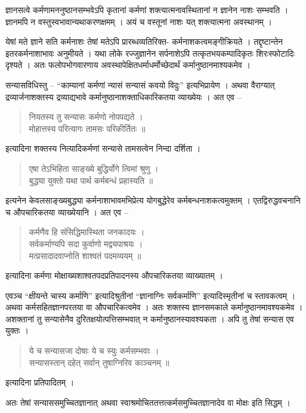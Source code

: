 ज्ञानसत्वे कर्मणामननुष्ठानसम्भवेऽपि कृतानां कर्मणां शक्त्यात्मनावस्थितानां न ज्ञानेन नाशः सम्भवति । ज्ञानमपि न वस्तुस्वभावान्यथाकरणक्षमम् । अयं च वस्तूनां नाशः यत् शक्त्यात्मना अवस्थानम् ।

येषां मते ज्ञाने सति कर्मनाशः तेषां मतेऽपि प्रारब्धव्यतिरिक्त- कर्मनाशकत्वमङ्गीक्रियते । तद्दृष्टान्तेन इतरकर्मनाशाभावः अनुमीयते । यथा लोके रज्जुज्ञानेन सर्पनाशेऽपि तत्कृतभयकम्पादिकृतः शिरःस्फोटादिः दृश्यते । अतः फलोपभोगवारणाय अवस्थापेक्षितधर्माधर्मोच्छेदार्थं कर्मानुष्ठानमाश्यकमेव ।

सन्यासविधिस्तु – “काम्यानां कर्मणां न्यासं सन्यासं कवयो विदुः” इत्यभिप्रायेण । अथवा वैराग्यात् द्रव्यार्जनाशक्तस्य द्रव्याद्यभावे कर्मानुष्ठानाशक्ताधिकारिकतया व्याख्येयः । 	अत एव –
\begin{verse}
नियतस्य तु सन्यासः कर्मणो नोपपद्यते ।\\
मोहात्तस्य परित्यागः तामसः परिकीर्तितः ॥
\end{verse}
इत्यादिना शक्तस्य नित्यादिकर्मणां सन्यासे तामसत्वेन निन्दा दर्शिता ।		
\begin{verse}
एषा तेऽभिहिता साङ्ख्ये बुद्धिर्योगे त्विमां श्रुणु ।\\
बुद्ध्या युक्तो यथा पार्थ कर्मबन्धं प्रहास्यति ॥
\end{verse}
इत्यनेन केवलसाङ्ख्यबुद्ध्या कर्मनाशाभावमभिप्रेत्य योगबुद्धेरेव कर्मबन्धनाशकत्वमुक्तम् । एतद्विरुद्धवचनानि च औपचारिकतया व्याख्येयानि । अत एव –
\begin{verse}
कर्मणैव हि संसिद्धिमास्थिता जनकादयः ।\\
सर्वकर्माण्यपि सदा कुर्वाणो मद्व्यपाश्रयः ।\\
मत्प्रसादादवाप्नोति शाश्वतं पदमव्ययम् ॥
\end{verse}
इत्यादिना कर्मणा मोक्षाख्यशाश्वतपदप्रतिपादनस्य औपचारिकतया व्याख्यातम् ।

एवञ्च “क्षीयन्ते चास्य कर्माणि” इत्यादिश्रुतीनां “ज्ञानाग्निः सर्वकर्माणि” इत्यादिस्मृतीनां च स्तावकत्वम् । अथवा कर्मसहितज्ञानपरतया वा औपचारिकत्वमेव । अतः शक्तस्य ज्ञानसमकाले कर्मानुष्ठानमावश्यकमेव । अशक्तानां तु सन्यासेनैव दुरितक्षयोत्पत्तिसम्भवात् न कर्मानुष्ठानस्यावश्यकता । अपि तु तेषां सन्यास एव युक्तः ।
\begin{verse}
ये च सन्यासजा दोषाः ये च स्युः कर्मसम्भवाः ।\\
सन्यासस्तान् दहेत् सर्वान् तुषाग्निरिव काञ्चनम् ॥
\end{verse}
इत्यादिना प्रतिपादितम् ।

अतः तेषां सन्याससमुच्चितज्ञानात् अथवा स्वाश्रमोचिततत्तत्कर्मसमुच्चितज्ञानादेव वा मोक्षः इति सिद्धम् ।

